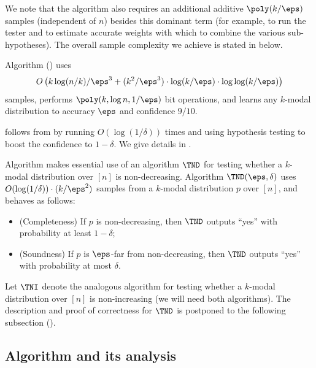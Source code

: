 We note that the algorithm also requires an additional additive
$\poly(k/\eps)$ samples (independent of $n$) besides this dominant term
(for example, to run the tester and to estimate accurate weights with
which to combine the various sub-hypotheses).  The overall sample complexity we achieve is stated in  below.

%

\begin{theorem}[Main] \label{thm:learnkmodal}
%
Algorithm
{\hyperref[alg:learn-kmodal]{}}
%
()
%
uses
$$O\left(k\log(n/k)/\eps^3 + ({k^2}/\eps^3)\cdot \log(k/\eps) \cdot \log\log(k/\eps) \right)$$
samples, performs  $\poly(k, \log n, 1/\eps)$
bit operations, and learns any $k$-modal distribution to accuracy $\eps$
and confidence $9/10$.
\end{theorem}

 follows from 
by running \hyperref[alg:learn-kmodal]{} $O(\log(1/\delta))$ times and
using hypothesis testing to boost the confidence to $1-\delta$.
 We give details in .

Algorithm \hyperref[alg:learn-kmodal]{} makes essential use of
an algorithm $\TND$ for testing whether a $k$-modal distribution over $[n]$
is non-decreasing.
Algorithm $\TND(\eps,\delta)$ uses $O(\log(1/\delta)) \cdot {(k/\eps^2)}$ samples from a $k$-modal
distribution $p$ over $[n]$, and behaves as follows:


\begin{itemize}
\item (Completeness) If $p$ is non-decreasing, then $\TND$ outputs ``yes'' with probability at least $1-\delta$;


\item (Soundness) If $p$ is $\eps$-far from non-decreasing, then $\TND$ outputs ``yes'' with probability at most $\delta$.
\end{itemize}


\noindent Let $\TNI$ denote the analogous algorithm for testing whether a $k$-modal distribution
over $[n]$ is non-increasing (we will need both algorithms). The description and proof of correctness for $\TND$ is postponed to the following subsection ().

\subsection{Algorithm \texorpdfstring{\hyperref[alg:learn-kmodal]{}}{Learn-kmodal} and its analysis} \label{ssec:learn-main}

